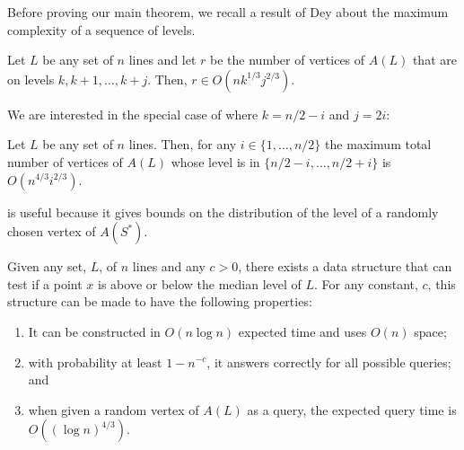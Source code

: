 \documentclass{patmorin}
\begin{document}
Before proving our main theorem, we recall a result of Dey
\cite[Theorem~4.2]{d98} about the maximum complexity of a sequence
of levels.

\begin{lem}
 Let $L$ be any set of $n$ lines and let $r$ be the number of vertices
 of $A(L)$ that are on levels $k,k+1,\ldots,k+j$.  Then, $r \in
 O(nk^{1/3}j^{2/3})$.
\end{lem}

We are interested in the special case of  where $k=n/2-i$
and $j=2i$:

\begin{cor}
  Let $L$ be any set of $n$ lines.  Then, for any $i\in\{1,\ldots,n/2\}$
  the maximum total number of vertices of $A(L)$ whose level is in
  $\{n/2-i,\ldots,n/2+i\}$ is $O(n^{4/3}i^{2/3})$.
\end{cor}

 is useful because it gives bounds on the distribution of
the level of a randomly chosen vertex of $A(S^*)$.

\begin{thm}
  Given any set, $L$, of $n$ lines and any $c>0$, there exists a data
  structure that can test if a point $x$ is above or below the median
  level of $L$.  For any constant, $c$, this structure can be made to
  have the following properties:
  \begin{enumerate}\setlength{\itemsep}{0mm}
    \item It can be constructed in
       $O(n\log n)$ expected time and uses $O(n)$ space;
    \item with probability
       at least $1-n^{-c}$, it answers correctly for all
       possible queries; and
    \item when given a random vertex of $A(L)$
       as a query, the expected query time is $O((\log n)^{4/3})$.
  \end{enumerate}
\end{thm}
\end{document}
